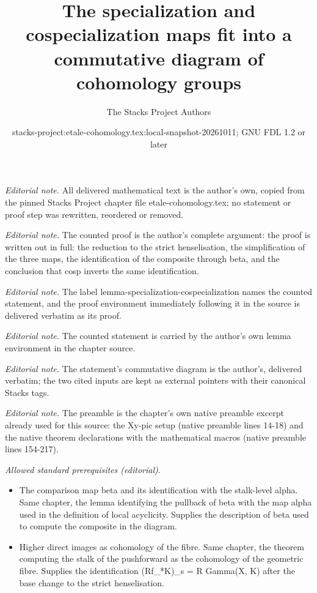 \documentclass[10pt,a4paper]{amsart}
\title{The specialization and cospecialization maps fit into a commutative diagram of cohomology groups}
\author{The Stacks Project Authors}
\date{stacks-project:etale-cohomology.tex:local-snapshot-20261011; GNU FDL 1.2 or later}
\theoremstyle{plain}
\theoremstyle{definition}
\theoremstyle{remark}
\numberwithin{equation}{subsection}
\begin{document}
\maketitle
\noindent\textit{Editorial note.} All delivered mathematical text is the author's own, copied from the pinned Stacks Project chapter file etale-cohomology.tex; no statement or proof step was rewritten, reordered or removed.\par\medskip
\noindent\textit{Editorial note.} The counted proof is the author's complete argument: the proof is written out in full: the reduction to the strict henselisation, the simplification of the three maps, the identification of the composite through beta, and the conclusion that cosp inverts the same identification.\par\medskip
\noindent\textit{Editorial note.} The label lemma-specialization-cospecialization names the counted statement, and the proof environment immediately following it in the source is delivered verbatim as its proof.\par\medskip
\noindent\textit{Editorial note.} The counted statement is carried by the author's own lemma environment in the chapter source.\par\medskip
\noindent\textit{Editorial note.} The statement's commutative diagram is the author's, delivered verbatim; the two cited inputs are kept as external pointers with their canonical Stacks tags.\par\medskip
\noindent\textit{Editorial note.} The preamble is the chapter's own native preamble excerpt already used for this source: the Xy-pic setup (native preamble lines 14-18) and the native theorem declarations with the mathematical macros (native preamble lines 154-217).\par\medskip
\noindent\textit{Allowed standard prerequisites (editorial).}\begin{itemize}
\item The comparison map beta and its identification with the stalk-level alpha. Same chapter, the lemma identifying the pullback of beta with the map alpha used in the definition of local acyclicity. Supplies the description of beta used to compute the composite in the diagram.
\item Higher direct images as cohomology of the fibre. Same chapter, the theorem computing the stalk of the pushforward as the cohomology of the geometric fibre. Supplies the identification (Rf\_*K)\_s = R Gamma(X, K) after the base change to the strict henselisation.
\end{itemize}\medskip
\end{document}
